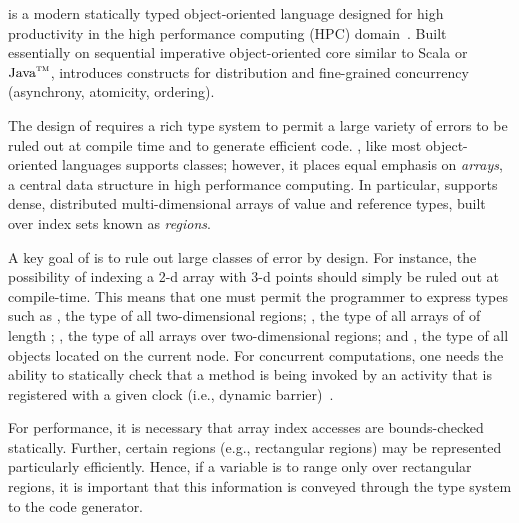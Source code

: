 
%

%
%
%

\Xten{} is a modern statically typed object-oriented
language designed for high productivity in the high performance
computing (HPC) domain~\cite{X10}. Built essentially on
sequential imperative object-oriented core
similar to
Scala or
$\mbox{Java}^{\mbox{\scriptsize\sc tm}}$,
\Xten{} introduces constructs for distribution and
fine-grained concurrency (asynchrony, atomicity, ordering).

The design of \Xten{} requires a rich type system to permit a
large variety of errors to be ruled out at compile time and to 
generate efficient code.  
\Xten{}, like most object-oriented languages supports classes;
however, it places
equal emphasis on {\em arrays}, a central data structure in high
performance computing.
In particular, \Xten{} supports dense,
distributed multi-dimensional arrays of value and reference types,
built over index sets known as {\em regions}.%

A key goal of \Xten{} is to rule out large classes of error
by design. For instance, the possibility of indexing a 2-d array with 3-d
points should simply be ruled out at compile-time. This means that one
must permit the programmer to express types such as ,
the type of all two-dimensional regions;
, the
type of all arrays of  of length ;
, the type of all  arrays
over two-dimensional regions; and
, the type of all  objects located on the
current node. For concurrent computations, one needs the ability to
statically check that a method is being invoked by an activity that is
registered with a given clock (i.e., dynamic barrier)~\cite{X10}.

For performance, it is necessary that array index accesses are
bounds-checked statically.  Further, certain regions (e.g.,
rectangular regions) may be represented particularly
efficiently.  Hence, if a variable is to range only over
rectangular regions, it is important that this information is
conveyed through the type system to the code generator.


